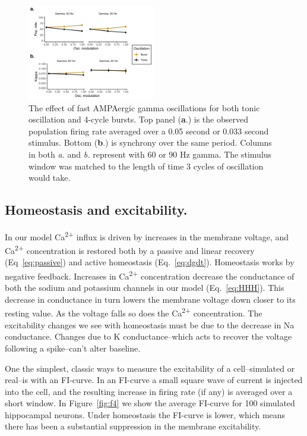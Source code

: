 \documentclass{article}
\begin{document}
\begin{figure}
\centering
\includegraphics[width=0.5\textwidth]{fig3.png}
\caption{\label{fig:f3}
    The effect of fast AMPAergic gamma oscillations for both tonic oscillation and 4-cycle bursts. 
    Top panel (\textbf{a}.) is the observed population firing rate averaged over a 0.05 second or 0.033 second stimulus. Bottom (\textbf{b}.) is synchrony over the same period. Columns in both \textit{a.} and \textit{b.} represent with 60 or 90 Hz gamma. The stimulus window was matched to the length of time 3 cycles of oscillation would take.
}
\end{figure}

\subsection*{Homeostasis and excitability.}
In our model Ca\textsuperscript{2+} influx is driven by increases in the membrane voltage, and Ca\textsuperscript{2+} concentration is restored both by a passive and linear recovery (Eq~\ref{eq:passive}) and active homeostasis (Eq.~\ref{eq:dgdt}). Homeostasis works by negative feedback. Increases in Ca\textsuperscript{2+} concentration decrease the conductance of both the sodium and potassium channels in our model (Eq.~\ref{eq:HHH}). This decrease in conductance in turn lowers the membrane voltage down closer to its resting value. As the voltage falls so does the Ca\textsuperscript{2+} concentration. The excitability changes we see with homeostasis must be due to the decrease in Na conductance. Changes due to K conductance--which acts to recover the voltage following a spike--can't alter baseline.

One the simplest, classic ways to measure the excitability of a cell--simulated or real--is with an FI-curve. In an FI-curve a small square wave of current is injected into the cell, and the resulting increase in firing rate (if any) is averaged over a short window. In Figure~\ref{fig:f4} we show the average FI-curve for 100 simulated hippocampal neurons. Under homeostasis the FI-curve is lower, which means there has been a substantial suppression in the membrane excitability.
\end{document}
